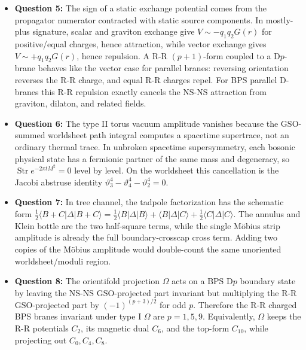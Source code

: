 \documentclass[
  10pt,
  a4paper,
  openany]{book}
\begin{document}
\begin{itemize}
  half-differentials, so the orientation reversal contributes a relative
  phase whose square is \(-1\); with the usual gluing convention this
  gives \(s_0s_l=-\eta_1\eta_2\). Hence same closed labels give the open
  NS trace, while opposite closed labels give the open R trace. In the
  NS-NS sector, \((-1)^F\) flips the sign of the left-moving fermion
  oscillators and the odd NS vacuum gives
  \((-1)^F|\mathrm{Dp},\eta\rangle_{\mathrm{NS}}=-|\mathrm{Dp},-\eta\rangle_{\mathrm{NS}}\),
  and similarly for \((-1)^{\bar F}\).
\item
  \textbf{Question 5:} The sign of a static exchange potential comes
  from the propagator numerator contracted with static source
  components. In mostly-plus signature, scalar and graviton exchange
  give \(V\sim-q_1q_2G(r)\) for positive/equal charges, hence
  attraction, while vector exchange gives \(V\sim+q_1q_2G(r)\), hence
  repulsion. A R-R \((p+1)\)-form coupled to a D\(p\)-brane behaves like
  the vector case for parallel branes: reversing orientation reverses
  the R-R charge, and equal R-R charges repel. For BPS parallel D-branes
  this R-R repulsion exactly cancels the NS-NS attraction from graviton,
  dilaton, and related fields.
\item
  \textbf{Question 6:} The type II torus vacuum amplitude vanishes
  because the GSO-summed worldsheet path integral computes a spacetime
  supertrace, not an ordinary thermal trace. In unbroken spacetime
  supersymmetry, each bosonic physical state has a fermionic partner of
  the same mass and degeneracy, so
  \(\operatorname{Str}e^{-2\pi t M^2}=0\) level by level. On the
  worldsheet this cancellation is the Jacobi abstruse identity
  \(\vartheta_3^4-\vartheta_4^4-\vartheta_2^4=0\).
\item
  \textbf{Question 7:} In tree channel, the tadpole factorization has
  the schematic form
  \(\frac{1}{2}\langle B+C|\Delta|B+C\rangle=\frac{1}{2}\langle B|\Delta|B\rangle+\langle B|\Delta|C\rangle+\frac{1}{2}\langle C|\Delta|C\rangle\).
  The annulus and Klein bottle are the two half-square terms, while the
  single Möbius strip amplitude is already the full boundary-crosscap
  cross term. Adding two copies of the Möbius amplitude would
  double-count the same unoriented worldsheet/moduli region.
\item
  \textbf{Question 8:} The orientifold projection \(\Omega\) acts on a
  BPS D\(p\) boundary state by leaving the NS-NS GSO-projected part
  invariant but multiplying the R-R GSO-projected part by
  \((-1)^{(p+3)/2}\) for odd \(p\). Therefore the R-R charged BPS branes
  invariant under type I \(\Omega\) are \(p=1,5,9\). Equivalently,
  \(\Omega\) keeps the R-R potentials \(C_2\), its magnetic dual
  \(C_6\), and the top-form \(C_{10}\), while projecting out
  \(C_0,C_4,C_8\).
\end{itemize}
\end{document}
